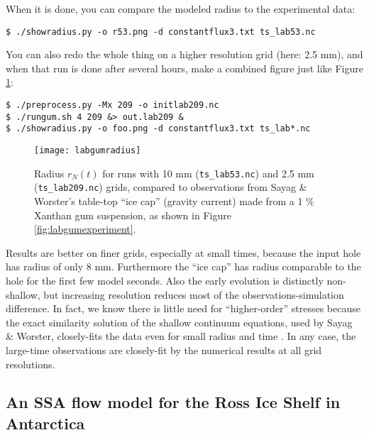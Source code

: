 When it is done, you can compare the modeled radius to the experimental data:
\begin{verbatim}
$ ./showradius.py -o r53.png -d constantflux3.txt ts_lab53.nc
\end{verbatim}
You can also redo the whole thing on a higher resolution grid (here: 2.5 mm), and when that run is done after several hours, make a combined figure just like Figure \ref{fig:labgumresult}:
\begin{verbatim}
$ ./preprocess.py -Mx 209 -o initlab209.nc
$ ./rungum.sh 4 209 &> out.lab209 &
$ ./showradius.py -o foo.png -d constantflux3.txt ts_lab*.nc
\end{verbatim}

\begin{figure}[ht]
\centering
\texttt{[image: labgumradius]}
\caption{Radius $r_N(t)$ for runs with 10 mm (\texttt{ts_lab53.nc}) and 2.5 mm (\texttt{ts_lab209.nc}) grids, compared to observations from Sayag \& Worster's \cite{SayagWorster2013} table-top ``ice cap'' (gravity current) made from a 1 \% Xanthan gum suspension, as shown in Figure \ref{fig:labgumexperiment}.}
\label{fig:labgumresult}
\end{figure}

Results are better on finer grids, especially at small times, because the input hole has radius of only 8 mm.  Furthermore the ``ice cap'' has radius comparable to the hole for the first few model seconds.  Also the early evolution is distinctly non-shallow, but increasing resolution reduces most of the observations-simulation difference.  In fact, we know there is little need for ``higher-order'' stresses because the exact similarity solution of the shallow continuum equations, used by Sayag \& Worster, closely-fits the data even for small radius and time \cite[Figure 4]{SayagWorster2013}.  In any case, the large-time observations are closely-fit by the numerical results at all grid resolutions.


\subsection{An SSA flow model for the Ross Ice Shelf in Antarctica}\label{sec:ross}   

